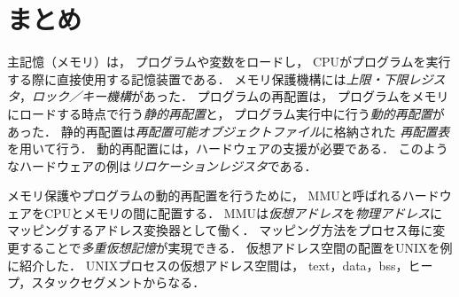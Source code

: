 

\section{まとめ}
主記憶（メモリ）は，
プログラムや変数をロードし，
CPUがプログラムを実行する際に直接使用する記憶装置である．
メモリ保護機構には\emph{上限・下限レジスタ}，\emph{ロック／キー機構}があった．
プログラムの再配置は，
プログラムをメモリにロードする時点で行う\emph{静的再配置}と，
プログラム実行中に行う\emph{動的再配置}があった．
静的再配置は\emph{再配置可能オブジェクトファイル}に格納された
\emph{再配置表}を用いて行う．
動的再配置には，ハードウェアの支援が必要である．
このようなハードウェアの例は\emph{リロケーションレジスタ}である．

メモリ保護やプログラムの動的再配置を行うために，
MMUと呼ばれるハードウェアをCPUとメモリの間に配置する．
MMUは\emph{仮想アドレス}を\emph{物理アドレス}に
マッピングするアドレス変換器として働く．
マッピング方法をプロセス毎に変更することで\emph{多重仮想記憶}が実現できる．
仮想アドレス空間の配置をUNIXを例に紹介した．
UNIXプロセスの仮想アドレス空間は，
text，data，bss，ヒープ，スタックセグメントからなる．

